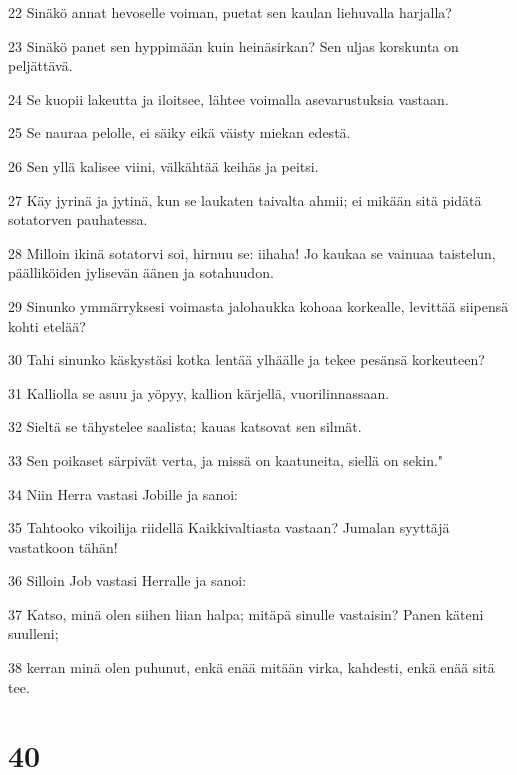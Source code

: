 \par 22 Sinäkö annat hevoselle voiman, puetat sen kaulan liehuvalla harjalla?
\par 23 Sinäkö panet sen hyppimään kuin heinäsirkan? Sen uljas korskunta on peljättävä.
\par 24 Se kuopii lakeutta ja iloitsee, lähtee voimalla asevarustuksia vastaan.
\par 25 Se nauraa pelolle, ei säiky eikä väisty miekan edestä.
\par 26 Sen yllä kalisee viini, välkähtää keihäs ja peitsi.
\par 27 Käy jyrinä ja jytinä, kun se laukaten taivalta ahmii; ei mikään sitä pidätä sotatorven pauhatessa.
\par 28 Milloin ikinä sotatorvi soi, hirnuu se: iihaha! Jo kaukaa se vainuaa taistelun, päälliköiden jylisevän äänen ja sotahuudon.
\par 29 Sinunko ymmärryksesi voimasta jalohaukka kohoaa korkealle, levittää siipensä kohti etelää?
\par 30 Tahi sinunko käskystäsi kotka lentää ylhäälle ja tekee pesänsä korkeuteen?
\par 31 Kalliolla se asuu ja yöpyy, kallion kärjellä, vuorilinnassaan.
\par 32 Sieltä se tähystelee saalista; kauas katsovat sen silmät.
\par 33 Sen poikaset särpivät verta, ja missä on kaatuneita, siellä on sekin."
\par 34 Niin Herra vastasi Jobille ja sanoi:
\par 35 Tahtooko vikoilija riidellä Kaikkivaltiasta vastaan? Jumalan syyttäjä vastatkoon tähän!
\par 36 Silloin Job vastasi Herralle ja sanoi:
\par 37 Katso, minä olen siihen liian halpa; mitäpä sinulle vastaisin? Panen käteni suulleni;
\par 38 kerran minä olen puhunut, enkä enää mitään virka, kahdesti, enkä enää sitä tee.

\chapter{40}

